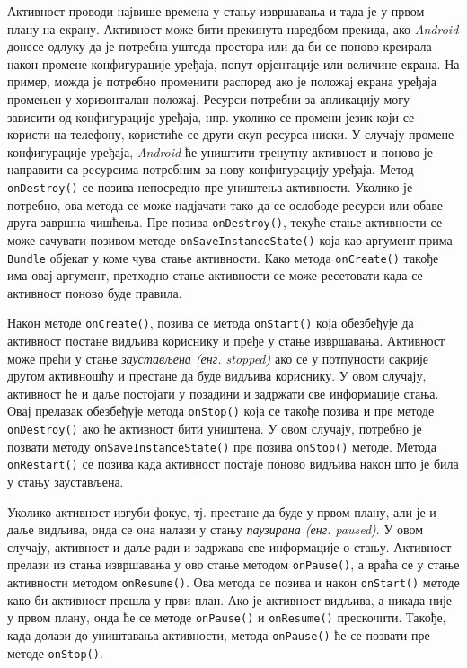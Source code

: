 \documentclass[12pt,oneside]{memoir}
\begin{document}
Активност проводи највише времена у стању извршавања и тада је у првом плану на екрану. Активност може бити прекинута наредбом прекида, ако \textit{Android} донесе одлуку да је потребна уштеда простора или да би се поново креирала након промене конфигурације уређаја, попут орјентације или величине екрана. На пример, можда је потребно променити распоред ако је положај екрана уређаја промењен у хоризонталан положај. Ресурси потребни за апликацију могу зависити од конфигурације уређаја, нпр. уколико се промени језик који се користи на телефону, користиће се други скуп ресурса ниски. У случају промене конфигурације уређаја, \textit{Android} ће уништити тренутну активност и поново је направити са ресурсима потребним за нову конфигурацију уређаја. Метод \texttt{onDestroy()} се позива непосредно пре уништења активности. Уколико је потребно, ова метода се може надјачати тако да се ослободе ресурси или обаве друга завршна чишћења. Пре позива \texttt{onDestroy()}, текуће стање активности се може сачувати позивом методе \texttt{onSaveInstanceState()} која као аргумент прима \texttt{Bundle} објекат у коме чува стање активности. Како метода \texttt{onCreate()} такође има овај аргумент, претходно стање активности се може ресетовати када се активност поново буде правила. 

Након методе \texttt{onCreate()}, позива се метода \texttt{onStart()} која обезбеђује да активност постане видљива кориснику и пређе у стање извршавања. Активност може прећи у стање \textit{заустављена (енг. stopped)} ако се у потпуности сакрије другом активношћу и престане да буде видљива кориснику. У овом случају, активност ће и даље постојати у позадини и задржати све информације стања. Овај прелазак обезбеђује метода \texttt{onStop()} која се такође позива и пре методе \texttt{onDestroy()} ако ће активност бити уништена. У овом случају, потребно је позвати методу \texttt{onSaveInstanceState()} пре позива \texttt{onStop()} методе. Метода \texttt{onRestart()} се позива када активност постаје поново видљива након што је била у стању заустављена.

Уколико активност изгуби фокус, тј. престане да буде у првом плану, али је и даље видљива, онда се она налази у стању \textit{паузирана (енг. paused)}. У овом случају, активност и даље ради и задржава све информације о стању. Активност прелази из стања извршавања у ово стање методом \texttt{onPause()}, а враћа се у стање активности методом \texttt{onResume()}. Ова метода се позива и након \texttt{onStart()} методе како би активност прешла у први план. Ако је активност видљива, а никада није у првом плану, онда ће се методе \texttt{onPause()} и \texttt{onResume()} прескочити. Такође, када долази до уништавања активности, метода \texttt{onPause()} ће се позвати пре методе \texttt{onStop()}. 
\end{document}
